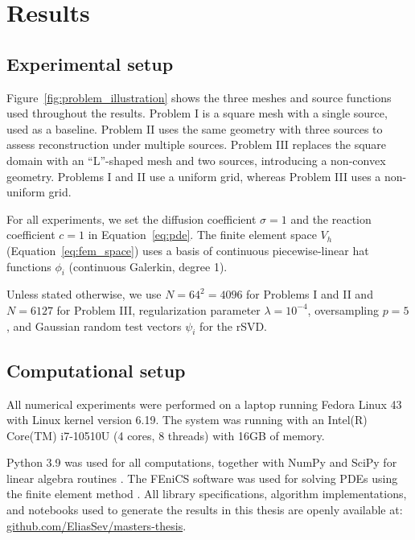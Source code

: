 \section{Results}\label{sec:results}
\subsection{Experimental setup}\label{sec:problems}

Figure~\ref{fig:problem_illustration} shows the three meshes and source functions used throughout the results. Problem I is a square mesh with a single source, used as a baseline. Problem II uses the same geometry with three sources to assess reconstruction under multiple sources. Problem III replaces the square domain with an ``L''-shaped mesh and two sources, introducing a non-convex geometry. Problems I 
and II use a uniform grid, whereas Problem III uses a non-uniform grid.

For all experiments, we set the diffusion coefficient $\sigma = 1$ and the reaction coefficient $c = 1$ in Equation~\eqref{eq:pde}. The finite element space $V_h$ (Equation~\eqref{eq:fem_space}) uses a basis of continuous piecewise-linear hat functions $\phi_i$ (continuous Galerkin, degree 1).

Unless stated otherwise, we use $N = 64^2 = 4096$ for Problems I and II and $N = 6127$ for Problem III, regularization parameter $\lambda = 10^{-4}$, oversampling $p = 5$, and Gaussian random test vectors $\psi_i$ for the rSVD.


\subsection{Computational setup}
All numerical experiments were performed on a laptop running Fedora Linux 43 with Linux kernel version 6.19. The system was running with an Intel(R) Core(TM) i7-10510U (4 cores, 8 threads) with 16GB of memory.

Python 3.9 was used for all computations, together with NumPy and SciPy for linear algebra routines \cite{harrisArrayProgrammingNumPy2020,virtanenSciPy10Fundamental2020}. The FEniCS software was used for solving PDEs using the finite element method \cite{alnaesFEniCSProjectVersion2015,loggAutomatedSolutionDifferential2012}. All library specifications, algorithm implementations, and notebooks used to generate the results in this thesis are openly available at: \href{https://github.com/EliasSev/masters-thesis}{github.com/EliasSev/masters-thesis}.



